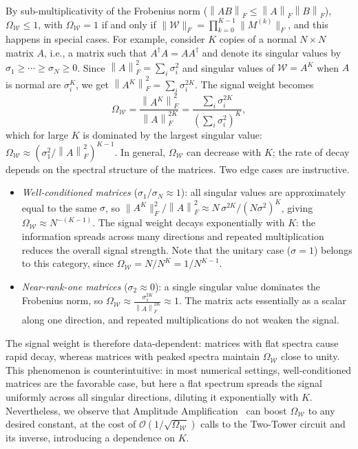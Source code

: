 \documentclass[a4paper,UKenglish,cleveref,autoref,thm-restate]{socg-lipics-v2021}
\newcommand{\norm}[1]{\left\| #1 \right\|}
\begin{document}
By sub-multiplicativity of the Frobenius norm
($\norm{AB}_F \leq \norm{A}_F \norm{B}_F$),
$\Omega_{\mathcal{W}} \leq 1$, with $\Omega_{\mathcal{W}} = 1$ if and only
if $\|\mathcal{W}\|_F= \prod_{k=0}^{K-1} \|M^{(k)}\|_F$, and this happens in special cases. For example, consider $K$ copies of a normal $N \times N$ matrix $A$, i.e., a matrix such that  $A^\dagger A=AA^\dagger$ and denote its singular values by
$\sigma_1 \geq \cdots \geq \sigma_N \ge 0$.
Since $\norm{A}_F^2 = \sum_i \sigma_i^2$ and singular values of $\mathcal{W} = A^K$ when $A$ is normal are $\sigma_i^K$,  we get  
$\norm{A^K}_F^2 = \sum_i \sigma_i^{2K}$.  The signal weight becomes
$$
  \Omega_{\mathcal{W}}
  = \frac{\norm{A^K}_F^2}{\norm{A}_F^{2K}}
  = \frac{\sum_i \sigma_i^{2K}}{(\sum_i \sigma_i^2)^K},
$$
which for large $K$ is dominated by the largest singular value:
$\Omega_{\mathcal{W}} \approx (\sigma_1^2 / \norm{A}_F^2)^{K-1}$.
In general, $\Omega_{\mathcal{W}}$ can decrease with $K$; the rate of decay depends on the spectral structure of the matrices.
Two edge cases are instructive.
\begin{itemize}
  \item \emph{Well-conditioned matrices}
    ($\sigma_1/\sigma_N \approx 1$): all singular values are
    approximately equal to the same  $\sigma$, so
    $\|A^K\|_F^2 / \norm{A}_F^2 \approx N\,\sigma^{2K} / (N\sigma^2)^K
    $, giving $\Omega_{\mathcal{W}} \approx N^{-(K-1)}$. The signal weight decays exponentially with $K$: the information spreads across many directions and repeated multiplication reduces the overall signal strength. Note that the unitary case ($\sigma = 1$) belongs to this category, since $\Omega_{\mathcal{W}} = N/N^K = 1/N^{K-1}$.
  \item \emph{Near-rank-one matrices}
    ($\sigma_2 \approx 0$): a single singular value dominates the Frobenius norm, so $\Omega_{\mathcal{W}} \approx \frac{\sigma_1^{2K}}{\norm{A}_F^{2K}} \approx 1$. The matrix acts essentially as a scalar along one direction, and repeated multiplications do not weaken the signal.
\end{itemize}
The signal weight is therefore data-dependent: matrices with flat spectra cause rapid decay, whereas matrices with peaked spectra maintain $\Omega_{\mathcal{W}}$ close to unity. This phenomenon is counterintuitive: in most numerical settings, well-conditioned matrices are the favorable case, but here a flat spectrum spreads the signal uniformly across all singular directions, diluting it exponentially with $K$. Nevertheless, we observe that Amplitude Amplification~\cite{brassard2002quantum} can boost $\Omega_{\mathcal{W}}$ to any desired constant, at the cost of $\mathcal{O}(1/\sqrt{\Omega_{\mathcal{W}}})$ calls to the Two-Tower circuit and its inverse, introducing a dependence on $K$. 
\end{document}
